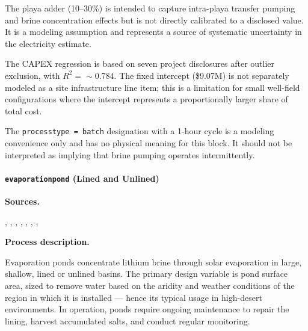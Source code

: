 \documentclass{article}
\renewcommand\_{\textunderscore\allowbreak}
\begin{document}
The playa adder (10--30\%) is intended to capture intra-playa transfer pumping and brine concentration effects but is not directly calibrated to a disclosed value. It is a modeling assumption and represents a source of systematic uncertainty in the electricity estimate.

The CAPEX regression is based on seven project disclosures after outlier exclusion, with $R^2=\sim 0.784$. The fixed intercept (\$9.07M) is not separately modeled as a site infrastructure line item; this is a limitation for small well-field configurations where the intercept represents a proportionally larger share of total cost.

The \texttt{process\_type = batch} designation with a 1-hour cycle is a modeling convenience only and has no physical meaning for this block. It should not be interpreted as implying that brine pumping operates intermittently.

\clearpage
\paragraph{\texttt{evaporation\_pond} (Lined and Unlined)}\label{app:04-methods-blockdefs-evappond}\leavevmode\par

\medskip
\noindent\textbf{Sources.}\quad

\citet{heEnvironmentalLifeCycle2025}, \citet{flemingLongrunAvailabilityMineral2024}, \citet{stampEnvironmentalImpactsTransition2012}, \citet{srkconsultingSECTechnicalReport2023a}, \citet{becerraTechnicalReportSummary2024}, \citet{srkconsultingSECTechnicalReport2022}, \citet{montgomeryassociatesconsultoreslimitadaSECTechnicalReport2023}, \citet{brookerSECTechnicalReport2023}

\medskip
\noindent\textbf{Process description.}\quad

Evaporation ponds concentrate lithium brine through solar evaporation in large, shallow, lined or unlined basins. The primary design variable is pond surface area, sized to remove water based on the aridity and weather conditions of the region in which it is installed --- hence its typical usage in high-desert environments. In operation, ponds require ongoing maintenance to repair the lining, harvest accumulated salts, and conduct regular monitoring.
\end{document}
